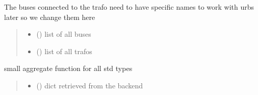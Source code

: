 \documentclass[letterpaper,10pt,english]{sphinxmanual}
\begin{document}

\begin{fulllineitems}
\label{\detokenize{docs_gui/js_api/network_editor/generate_editable_network:changeTrafoBusNames}}
\pysigstartsignatures
{}
\pysigstopsignatures
\sphinxAtStartPar
The buses connected to the trafo need to have specific names to work with urbs later so we change them here
\begin{quote}\begin{description}
\begin{itemize}
\item {} 
\sphinxAtStartPar
{} () \textendash{} list of all buses

\item {} 
\sphinxAtStartPar
{} () \textendash{} list of all trafos

\end{itemize}

\end{description}\end{quote}

\end{fulllineitems}


\begin{fulllineitems}
\label{\detokenize{docs_gui/js_api/network_editor/generate_editable_network:extractStdTypes}}
\pysigstartsignatures
{}
\pysigstopsignatures
\sphinxAtStartPar
small aggregate function for all std types
\begin{quote}\begin{description}
\begin{itemize}
\item {} 
\sphinxAtStartPar
{} () \textendash{} dict retrieved from the backend

\end{itemize}

\end{description}\end{quote}

\end{fulllineitems}
\end{document}
